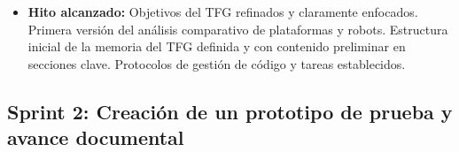 \begin{itemize}
\begin{itemize}
		\item Delimitación conceptual del laboratorio virtual frente a un entorno virtual genérico.
		\item Avance en la documentación contextualizada del proyecto, asegurando que cada concepto teórico estuviera bien anclado y justificado.
		\item Documentación de las decisiones de diseño y técnicas tomadas hasta la fecha.
	\end{itemize}
	\item \textbf{Hito alcanzado:} Objetivos del TFG refinados y claramente enfocados. Primera versión del análisis comparativo de plataformas y robots. Estructura inicial de la memoria del TFG definida y con contenido preliminar en secciones clave. Protocolos de gestión de código y tareas establecidos.
\end{itemize}
	
\subsection{Sprint 2: Creación de un prototipo de prueba y avance documental}

